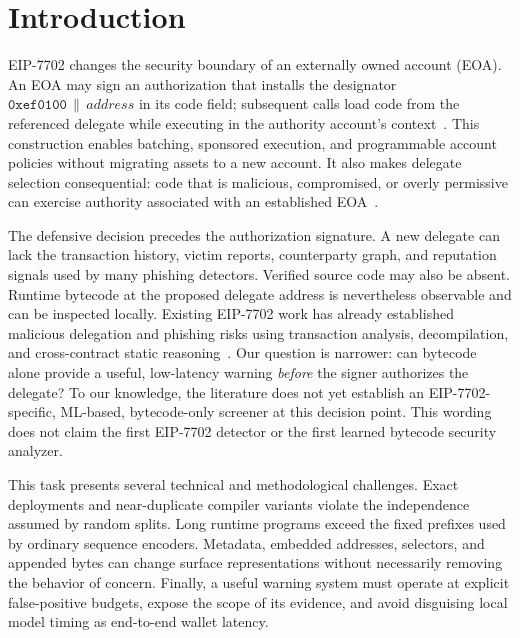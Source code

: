 \documentclass[conference]{IEEEtran}
\begin{document}
\section{Introduction}
\label{sec:introduction}

EIP-7702 changes the security boundary of an externally owned account (EOA). An EOA may sign an
authorization that installs the designator $\mathtt{0xef0100}\,\|\,\mathit{address}$ in its code
field; subsequent calls load code from the referenced delegate while executing in the authority
account's context~\cite{eip7702}. This construction enables batching, sponsored execution, and
programmable account policies without migrating assets to a new account. It also makes delegate
selection consequential: code that is malicious, compromised, or overly permissive can exercise
authority associated with an established EOA~\cite{qi2025eip7702phishing,huang2026darkside}.

The defensive decision precedes the authorization signature. A new delegate can lack the
transaction history, victim reports, counterparty graph, and reputation signals used by many
phishing detectors. Verified source code may also be absent. Runtime bytecode at the proposed
delegate address is nevertheless observable and can be inspected locally. Existing EIP-7702 work
has already established malicious delegation and phishing risks using transaction analysis,
decompilation, and cross-contract static reasoning~\cite{qi2025eip7702phishing,huang2026darkside}.
Our question is narrower: can bytecode alone provide a useful, low-latency warning \emph{before}
the signer authorizes the delegate? To our knowledge, the literature does not yet establish an
EIP-7702-specific, ML-based, bytecode-only screener at this decision point. This wording does not
claim the first EIP-7702 detector or the first learned bytecode security analyzer.

This task presents several technical and methodological challenges. Exact deployments and
near-duplicate compiler variants violate the independence assumed by random splits. Long runtime
programs exceed the fixed prefixes used by ordinary sequence encoders. Metadata, embedded
addresses, selectors, and appended bytes can change surface representations without necessarily
removing the behavior of concern. Finally, a useful warning system must operate at explicit
false-positive budgets, expose the scope of its evidence, and avoid disguising local model timing
as end-to-end wallet latency.
\end{document}
